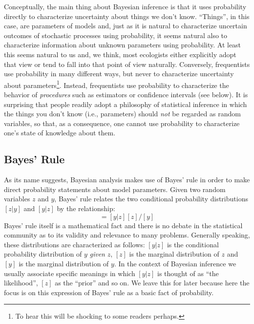 Conceptually, the main thing about Bayesian inference is that it uses
probability directly to characterize uncertainty about things we don't
know.  ``Things'', in this case, are parameters of models and, just as
it is natural to characterize uncertain outcomes of stochastic
processes using probability, it seems natural also to characterize
information about unknown parameters using probability. At least
this seems natural to us and, we think, most ecologists either
explicitly adopt that view or tend to fall into that point of view
naturally.  Conversely, frequentists use probability in many different
ways, but never to characterize uncertainty about
parameters\footnote{To hear this will be shocking to some readers
  perhaps.}. Instead, frequentists use probability to characterize the
behavior of {\it procedures} such as estimators or confidence
intervals (see below). It is surprising that people readily
adopt a philosophy of statistical inference in which the things you
don't know (i.e., parameters) should {\it not} be regarded as random
variables, so that, as a consequence, one cannot use probability to
characterize one's state of knowledge about them.


\subsection{Bayes' Rule}

As its name suggests, Bayesian analysis makes use of Bayes' rule in
order to make direct probability statements about model
parameters. Given two random variables $z$ and $y$, Bayes' rule relates
the two conditional probability distributions $[z|y]$ and $[y|z]$ by
the relationship:
\begin{equation}
[z|y] = [y|z][z]/[y]
\label{glms.eq.bayes}
\end{equation}
Bayes' rule itself is a mathematical fact and there is no debate in
the statistical community as to its validity and relevance to many
problems. Generally speaking, these distributions are characterized as
follows: $[y|z]$ is the conditional probability distribution of $y$
{\it given} $z$, $[z]$ is the marginal distribution of $z$ and $[y]$
is the marginal distribution of $y$. In the context of Bayesian
inference we usually associate specific meanings in which $[y|z]$ is
thought of as ``the likelihood'', $[z]$ as the ``prior'' and so on. We
leave this for later because here the focus is on this expression of
Bayes' rule as a basic fact of probability.


